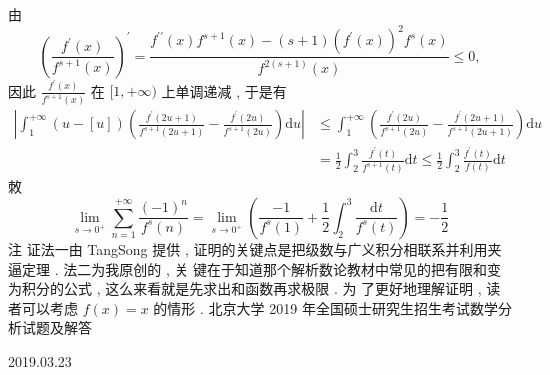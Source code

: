 \documentclass[10pt]{article}
\begin{document}
 由 
$$
\left(\frac{f^{\prime}(x)}{f^{s+1}(x)}\right)^{\prime}=\frac{f^{\prime \prime}(x) f^{s+1}(x)-(s+1)\left(f^{\prime}(x)\right)^{2} f^{s}(x)}{f^{2(s+1)}(x)} \leqslant 0,
$$
 因此  $\frac{f^{\prime}(x)}{f^{s+1}(x)}$  在  $[1,+\infty)$  上单调递减 ,  于是有 
$$
\begin{aligned}
\left|\int_{1}^{+\infty}(u-[u])\left(\frac{f^{\prime}(2 u+1)}{f^{s+1}(2 u+1)}-\frac{f^{\prime}(2 u)}{f^{s+1}(2 u)}\right) \mathrm{d} u\right| & \leqslant \int_{1}^{+\infty}\left(\frac{f^{\prime}(2 u)}{f^{s+1}(2 u)}-\frac{f^{\prime}(2 u+1)}{f^{s+1}(2 u+1)}\right) \mathrm{d} u \\
&=\frac{1}{2} \int_{2}^{3} \frac{f^{\prime}(t)}{f^{s+1}(t)} \mathrm{d} t \leqslant \frac{1}{2} \int_{2}^{3} \frac{f^{\prime}(t)}{f(t)} \mathrm{d} t
\end{aligned}
$$
 敇 
$$
\lim _{s \rightarrow 0^{+}} \sum_{n=1}^{+\infty} \frac{(-1)^{n}}{f^{s}(n)}=\lim _{s \rightarrow 0^{+}}\left(\frac{-1}{f^{s}(1)}+\frac{1}{2} \int_{2}^{3} \frac{\mathrm{d} t}{f^{s}(t)}\right)=-\frac{1}{2}
$$
 注   证法一由  TangSong  提供 ,  证明的关键点是把级数与广义积分相联系并利用夹逼定理 .  法二为我原创的 ,  关   键在于知道那个解析数论教材中常见的把有限和变为积分的公式 ,  这么来看就是先求出和函数再求极限 .  为   了更好地理解证明 ,  读者可以考虑  $f(x)=x$  的情形 .  北京大学  2019  年全国硕士研究生招生考试数学分析试题及解答     

2019.03.23
\end{document}
